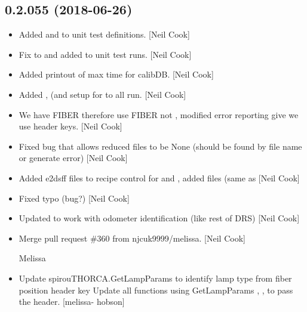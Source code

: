 \documentclass[a4paper,10pt,english]{report}
\begin{document}
\subsection{0.2.055 (2018-06-26)}
\label{\detokenize{misc/changelog:id409}}\begin{itemize}
\item {} 
Added  and  to unit test definitions. {[}Neil Cook{]}

\item {} 
Fix to  and  added to unit test runs. {[}Neil Cook{]}

\item {} 
Added printout of max time for calibDB. {[}Neil Cook{]}

\item {} 
Added ,  (and setup for  to all run. {[}Neil
Cook{]}

\item {} 
We have FIBER therefore use FIBER not , modified error
reporting give we use header keys. {[}Neil Cook{]}

\item {} 
Fixed bug that allows reduced files to be None (should be found by
file name or generate error) {[}Neil Cook{]}

\item {} 
Added e2dsff files to recipe control for  and , added
 files (same as  {[}Neil Cook{]}

\item {} 
Fixed typo (bug?) {[}Neil Cook{]}

\item {} 
Updated to work with odometer identification (like rest of DRS) {[}Neil
Cook{]}

\item {} 
Merge pull request \#360 from njcuk9999/melissa. {[}Neil Cook{]}

Melissa

\item {} 
Update spirouTHORCA.GetLampParams to identify lamp type from fiber
position header key Update all functions using GetLampParams ,
,   to pass the header. {[}melissa-
hobson{]}


\end{itemize}
\end{document}
